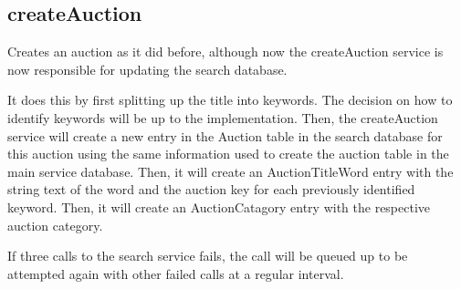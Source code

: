 \documentclass[12pt,a4paper]{article}
\begin{document}
\subsection{createAuction}

Creates an auction as it did before, although now the createAuction service is
now responsible for updating the search database.

It does this by first splitting up the title into keywords. The decision on how
to identify keywords will be up to the implementation. Then, the createAuction
service will create a new entry in the Auction table in the search database for
this auction using the same information used to create the auction table in the
main service database. Then, it will create an AuctionTitleWord entry with the
string text of the word and the auction key for each previously identified
keyword. Then, it will create an AuctionCatagory entry with the respective
auction category.

If three calls to the search service fails, the call will be queued up to be
attempted again with other failed calls at a regular interval.

\end{document}

